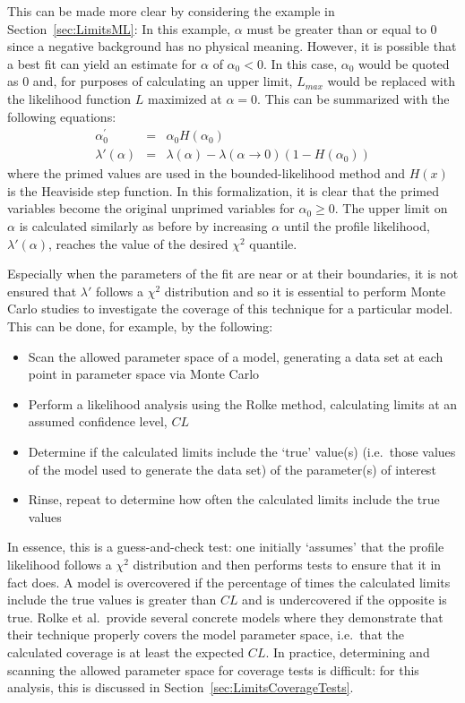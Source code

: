 This can be made more clear by considering the example in Section~\ref{sec:LimitsML}:  In this example, $\alpha$ must be greater than or equal to 0 since a negative background has no physical meaning.  However, it is possible that a best fit can yield an estimate for $\alpha$ of $\alpha_{0}<0$.  In this case, $\alpha_{0}$ would be quoted as 0 and, for purposes of calculating an upper limit, $L_{max}$ would be replaced with the likelihood function $L$ maximized at $\alpha = 0$.  This can be summarized with the following equations:
		\begin{equation}
			\begin{array}{rcl}
				\alpha_0^{\prime} & = & \alpha_0 H (\alpha_0) \\
				\lambda' (\alpha) & = & \lambda(\alpha) - \lambda(\alpha \to 0) (1 - H(\alpha_0))
			\end{array}
		\end{equation}
where the primed values are used in the bounded-likelihood method and $H(x)$ is the Heaviside step function.  In this formalization, it is clear that the primed variables become the original unprimed variables for $\alpha_{0}\geq0$.  The upper limit on $\alpha$ is calculated similarly as before by increasing $\alpha$ until the profile likelihood, $\lambda'(\alpha)$, reaches the value of the desired $\chi^{2}$ quantile. 

 Especially when the parameters of the fit are near or at their boundaries, it is not ensured that $\lambda'$ follows a $\chi^{2}$ distribution and so it is essential to perform Monte Carlo studies to investigate the coverage of this technique for a particular model.  This can be done, for example, by the following:
		\begin{itemize}
			\item Scan the allowed parameter space of a model, 
			generating a data set at each point in parameter space via Monte Carlo
			\item Perform a likelihood analysis using the Rolke method, calculating limits at an 
			assumed confidence level, $CL$
			\item Determine if the calculated limits include the `true' value(s) (i.e.~those values of 
			the model used to generate the data set) of the parameter(s) of interest 
			\item Rinse, repeat to determine how often the calculated limits include the true values
		\end{itemize}			
In essence, this is a guess-and-check test: one initially `assumes' that the profile likelihood follows a $\chi^{2}$ distribution and then performs tests to ensure that it in fact does.  A model is overcovered if the percentage of times the calculated limits include the true values is greater than $CL$ and is undercovered if the opposite is true.  Rolke et al.~provide several concrete models where they demonstrate that their technique properly covers the model parameter space, i.e.~that the calculated coverage is at least the expected $CL$.  In practice, determining and scanning the allowed parameter space for coverage tests is difficult: for this analysis, this is discussed in Section~\ref{sec:LimitsCoverageTests}.


